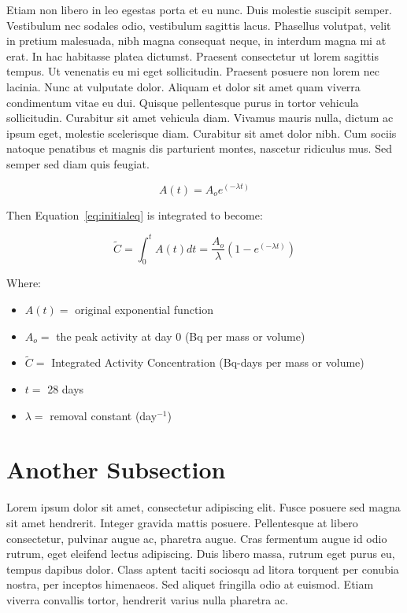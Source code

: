 \documentclass[double,12pt]{beavtex}
\begin{document}
Etiam non libero in leo egestas porta et eu nunc. Duis molestie suscipit semper. Vestibulum nec sodales odio, vestibulum sagittis lacus. Phasellus volutpat, velit in pretium malesuada, nibh magna consequat neque, in interdum magna mi at erat. In hac habitasse platea dictumst. Praesent consectetur ut lorem sagittis tempus. Ut venenatis eu mi eget sollicitudin. Praesent posuere non lorem nec lacinia. Nunc at vulputate dolor. Aliquam et dolor sit amet quam viverra condimentum vitae eu dui. Quisque pellentesque purus in tortor vehicula sollicitudin. Curabitur sit amet vehicula diam. Vivamus mauris nulla, dictum ac ipsum eget, molestie scelerisque diam. Curabitur sit amet dolor nibh. Cum sociis natoque penatibus et magnis dis parturient montes, nascetur ridiculus mus. Sed semper sed diam quis feugiat. 

\begin{equation}
A(t)=A_{o}e^{(-\lambda t)}
\label{eq:initialeq}
\end{equation}

Then Equation~\ref{eq:initialeq} is integrated to become:

\begin{equation}
\tilde{C}=\int_0^{t}A(t)dt = \frac{A_{o}}{\lambda} (1-e^{(-\lambda t)})
\label{eq:finaleq}
\end{equation}

Where:

\begin{itemize}
\item $A(t) =$ original exponential function
\item $A_{o} =$ the peak activity at day 0 (Bq per mass or volume)
\item $\tilde{C} =$ Integrated Activity Concentration (Bq-days per mass or volume)
\item $t =$ 28 days
\item $\lambda =$ removal constant (day$^{-1}$)
\end{itemize}



\section{Another Subsection}

Lorem ipsum dolor sit amet, consectetur adipiscing elit. Fusce posuere sed magna sit amet hendrerit. Integer gravida mattis posuere. Pellentesque at libero consectetur, pulvinar augue ac, pharetra augue. Cras fermentum augue id odio rutrum, eget eleifend lectus adipiscing. Duis libero massa, rutrum eget purus eu, tempus dapibus dolor. Class aptent taciti sociosqu ad litora torquent per conubia nostra, per inceptos himenaeos. Sed aliquet fringilla odio at euismod. Etiam viverra convallis tortor, hendrerit varius nulla pharetra ac. 
\end{document}
